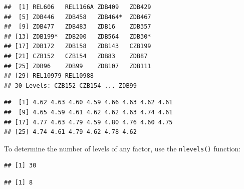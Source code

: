 \documentclass[]{book}
\newenvironment{Shaded}{\begin{snugshade}}{\end{snugshade}}
\newcommand{\KeywordTok}[1]{\textcolor[rgb]{0.13,0.29,0.53}{\textbf{#1}}}
\newcommand{\NormalTok}[1]{#1}
\newcommand{\OperatorTok}[1]{\textcolor[rgb]{0.81,0.36,0.00}{\textbf{#1}}}
\begin{document}
\begin{verbatim}
##  [1] REL606   REL1166A ZDB409   ZDB429  
##  [5] ZDB446   ZDB458   ZDB464*  ZDB467  
##  [9] ZDB477   ZDB483   ZDB16    ZDB357  
## [13] ZDB199*  ZDB200   ZDB564   ZDB30*  
## [17] ZDB172   ZDB158   ZDB143   CZB199  
## [21] CZB152   CZB154   ZDB83    ZDB87   
## [25] ZDB96    ZDB99    ZDB107   ZDB111  
## [29] REL10979 REL10988
## 30 Levels: CZB152 CZB154 ... ZDB99
\end{verbatim}

\begin{Shaded}
\end{Shaded}

\begin{verbatim}
##  [1] 4.62 4.63 4.60 4.59 4.66 4.63 4.62 4.61
##  [9] 4.65 4.59 4.61 4.62 4.62 4.63 4.74 4.61
## [17] 4.77 4.63 4.79 4.59 4.80 4.76 4.60 4.75
## [25] 4.74 4.61 4.79 4.62 4.78 4.62
\end{verbatim}

To determine the number of levels of any factor, use the \texttt{nlevels()} function:

\begin{Shaded}
\end{Shaded}

\begin{verbatim}
## [1] 30
\end{verbatim}

\begin{Shaded}
\end{Shaded}

\begin{verbatim}
## [1] 8
\end{verbatim}

\begin{Shaded}
\end{Shaded}
\end{document}
